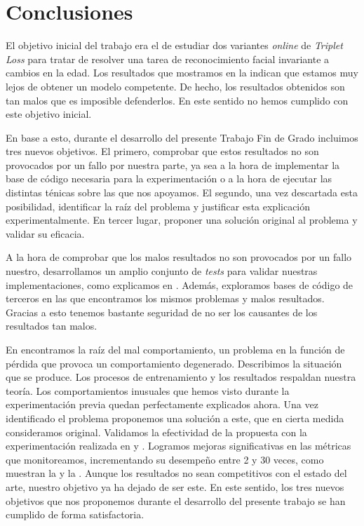 \chapter{Conclusiones} \label{ich:conclusiones}

El objetivo inicial del trabajo era el de estudiar dos variantes \textit{online} de \textit{Triplet Loss} para tratar de resolver una tarea de reconocimiento facial invariante a cambios en la edad. Los resultados que mostramos en la \tableref{} indican que estamos muy lejos de obtener un modelo competente. De hecho, los resultados obtenidos son tan malos que es imposible defenderlos. En este sentido no hemos cumplido con este objetivo inicial.

En base a esto, durante el desarrollo del presente Trabajo Fin de Grado incluimos tres nuevos objetivos. El primero, comprobar que estos resultados no son provocados por un fallo por nuestra parte, ya sea a la hora de implementar la base de código necesaria para la experimentación o a la hora de ejecutar las distintas ténicas sobre las que nos apoyamos. El segundo, una vez descartada esta posibilidad, identificar la raíz del problema y justificar esta explicación experimentalmente. En tercer lugar, proponer una solución original al problema y validar su eficacia.

A la hora de comprobar que los malos resultados no son provocados por un fallo nuestro, desarrollamos un amplio conjunto de \textit{tests} para validar nuestras implementaciones, como explicamos en \sectionref{}. Además, exploramos bases de código de terceros en las que encontramos los mismos problemas y malos resultados. Gracias a esto tenemos bastante seguridad de no ser los causantes de los resultados tan malos.

En \sectionref{} encontramos la raíz del mal comportamiento, un problema en la función de pérdida que provoca un comportamiento degenerado. Describimos la situación que se produce. Los procesos de entrenamiento y los resultados respaldan nuestra teoría. Los comportamientos inusuales que hemos visto durante la experimentación previa quedan perfectamente explicados ahora. Una vez identificado el problema proponemos una solución a este, que en cierta medida consideramos original. Validamos la efectividad de la propuesta con la experimentación realizada en \sectionref{} y \sectionref{}. Logramos mejoras significativas en las métricas que monitoreamos, incrementando su desempeño entre 2 y 30 veces, como muestran la \tableref{} y la \tableref{}. Aunque los resultados no sean competitivos con el estado del arte, nuestro objetivo ya ha dejado de ser este. En este sentido, los tres nuevos objetivos que nos proponemos durante el desarrollo del presente trabajo se han cumplido de forma satisfactoria.

